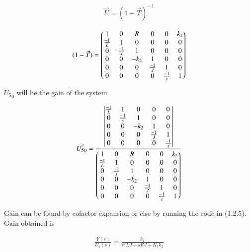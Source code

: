 \begin{enumerate}[label=\thesection.\arabic*.,ref=\thesection.\theenumi]
\begin{align}
    \Vec{U} = {(1-\Vec{T})^-}^1
\end{align}

\begin{align}
    (1-\Vec{T}) = \begin{pmatrix}1 & 0 & R & 0 & 0 & k_2\\
    \frac{-1}{L} & 1 & 0 & 0 & 0 & 0\\
    0 & \frac{-1}{s} & 1 & 0 & 0 & 0\\
    0 & 0 & -k_2 & 1 & 0 & 0\\
    0 & 0 & 0 & \frac{-1}{J} & 1 & 0\\
    0 & 0 & 0 & 0& \frac{-1}{s} & 1 \end{pmatrix} 
\end{align}

${U_5}_0$ will be the gain of the system

\begin{align}
    \Vec{{U_5}_0} = \frac{\begin{vmatrix}\frac{-1}{L} & 1 & 0 & 0 & 0 \\
    0 & \frac{-1}{s} & 1 & 0 & 0 \\
    0 & 0 & -k_2 & 1 & 0 \\
    0 & 0 & 0 & \frac{-1}{J} & 1 \\
    0 & 0 & 0 & 0& \frac{-1}{s} \end{vmatrix}}{ \begin{pmatrix}1 & 0 & R & 0 & 0 & k_2\\
    \frac{-1}{L} & 1 & 0 & 0 & 0 & 0\\
    0 & \frac{-1}{s} & 1 & 0 & 0 & 0\\
    0 & 0 & -k_2 & 1 & 0 & 0\\
    0 & 0 & 0 & \frac{-1}{J} & 1 & 0\\
    0 & 0 & 0 & 0& \frac{-1}{s} & 1 \end{pmatrix}}
\end{align}

Gain can be found by cofactor expansion or else by running the code in (1.2.5).
Gain obtained is 

\begin{align}
    \frac{Y(s)}{U_1(s)}=\frac{k_1}{s^2LJ+sRJ+K_1k_2}
\end{align}



\end{enumerate}